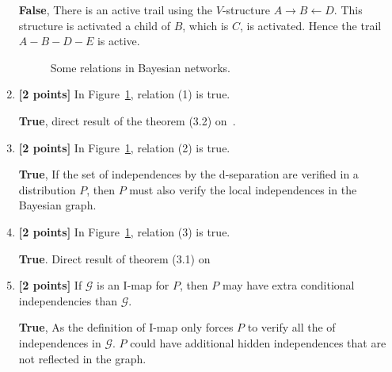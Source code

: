 \documentclass[12pt]{article}
\newcommand{\Gcal}{\mathcal{G}}
\newcommand{\Ical}{\mathcal{I}}
\begin{document}
\begin{enumerate}
\begin{solution}
 \textbf{False}, There is an active trail using the $V$-structure
 $A\rightarrow B \leftarrow D$.
 This structure is activated a child of $B$, which is $C$, is activated.
 Hence the trail $A-B-D-E$ is active.
\end{solution}



\begin{figure}[h]
\centering
{}
\caption{Some relations in Bayesian networks.}
\label{fig:relations-bayesnet}
\end{figure}



\item \textbf{[2 points]} In Figure~\ref{fig:relations-bayesnet}, relation (1) is true.

\begin{solution}
  \textbf{True}, direct result of  the theorem (3.2) on~\cite{koller2009probabilistic}.
\end{solution}
\item \textbf{[2 points]} In Figure~\ref{fig:relations-bayesnet}, relation (2) is true.

\begin{solution}
  \textbf{True}, If the set of independences by the d-separation are
  verified in a distribution $P$, then $P$ must also verify the local
  independences in the Bayesian graph.
\end{solution}
\item \textbf{[2 points]} In Figure~\ref{fig:relations-bayesnet}, relation (3) is true.

\begin{solution}
  \textbf{True}. Direct result of theorem (3.1)
  on~\cite{koller2009probabilistic}
\end{solution}

\item \textbf{[2 points]} If $ \Gcal $ is an I-map for $ P $, then $ P $ may have extra conditional independencies than $ \Gcal $.


\begin{solution}
  \textbf{True}, As the definition of I-map only forces $P$ to verify all the
  of independences in $\Gcal$. $P$ could have additional hidden
  independences that are not reflected in the graph.
\end{solution}


\end{enumerate}
\end{document}

